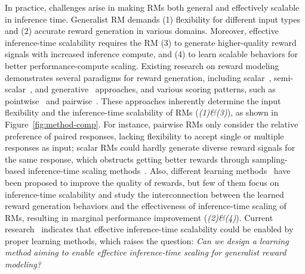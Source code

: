 \documentclass{article} %
\begin{document}
In practice, challenges arise in making RMs both general and effectively scalable in inference time. 
Generalist RM demands (1) flexibility for different input types and (2) accurate reward generation in various domains. 
Moreover, effective inference-time scalability requires the RM (3) to generate higher-quality reward signals with increased inference compute, and (4) to learn scalable behaviors for better performance-compute scaling. 
Existing research on reward modeling demonstrates several paradigms for reward generation, including scalar~\citep{cobbe2021trainingverifierssolvemath, wang2024helpsteer, liu2024skyworkrewardbagtricksreward}, semi-scalar~\citep{ye2024improvingrewardmodelssynthetic,yu2025selfgeneratedcritiquesboostreward,zhang2025generative}, and generative~\citep{li2024generative,kim-etal-2024-prometheus,vu-etal-2024-foundational,cao2024compassjudger1allinonejudgemodel,arabzadeh-etal-2024-assessing,ye2025learning,alexandru2025atlaseleneminigeneral,yu2025improvellmasajudgeabilitygeneral} approaches, and various scoring patterns, such as pointwise~\citep{0627eaad-0ecb-353b-9c3d-81e29de3658f,pmlr-v202-gao23h,pmlr-v235-yuan24d,winata2025metametrics,10.1145/3701551.3703583} and pairwise~\citep{park-etal-2024-offsetbias, chatbot-arena,jiang-etal-2023-llm,wang2024selftaughtevaluators,liu2025pairjudgermperformbestofn}. These approaches inherently determine the input flexibility and the inference-time scalability of RMs (\textit{(1)\&(3)}), as shown in Figure~\ref{fig:method-comp}. For instance, pairwise RMs only consider the relative preference of paired responses, lacking flexibility to accept single or multiple responses as input; scalar RMs could hardly generate diverse reward signals for the same response, which obstructs getting better rewards through sampling-based inference-time scaling methods~\citep{snell2025scaling}. 
Also, different learning methods~\citep{wang-etal-2024-interpretable,ankner2024critiqueoutloudrewardmodels,wang2024selftaughtevaluators,mahan2024generativerewardmodels} have been proposed to improve the quality of rewards, but few of them focus on inference-time scalability and study the interconnection between the learned reward generation behaviors and the effectiveness of inference-time scaling of RMs, resulting in marginal performance improvement (\textit{(2)\&(4)}).
Current research~\citep{deepseekai2025deepseekr1incentivizingreasoningcapability} indicates that effective inference-time scalability could be enabled by proper learning methods, which raises the question: \emph{Can we design a learning method aiming to enable effective inference-time scaling for generalist reward modeling?}
\end{document}
